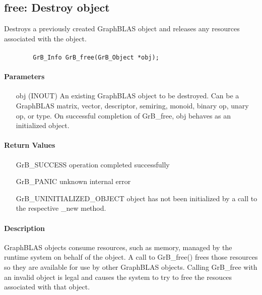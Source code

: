 \subsection{{\sf free}: Destroy object}

Destroys a previously created GraphBLAS object and releases any resources associated with the object.

\paragraph{\syntax}

\begin{verbatim}
        GrB_Info GrB_free(GrB_Object *obj);
\end{verbatim}


\paragraph{Parameters}

\begin{itemize}[leftmargin=1.1in]
	\item[{\sf obj}] ({\sf INOUT}) An existing GraphBLAS object to be destroyed. 
    Can be a GraphBLAS matrix, vector, descriptor, semiring, monoid, binary op, 
		unary op, or type. On successful completion of {\sf GrB\_free}, {\sf obj} behaves as an initialized object.
\end{itemize}

\paragraph{Return Values}

\begin{itemize}[leftmargin=2.1in]
\item[{\sf GrB\_SUCCESS}]        operation completed successfully
\item[{\sf GrB\_PANIC}]          unknown internal error
\item[{\sf GrB\_UNINITIALIZED\_OBJECT}]       object has not been initialized by a call 
                                 to the respective {\sf *\_new} method.
\end{itemize}

\paragraph{Description}

GraphBLAS objects consume resources, such as memory,  
managed by the runtime system on behalf of the object.  A call to {\sf GrB\_free()}
frees those resources so they are available for use by other GraphBLAS objects.
Calling {\sf GrB\_free} with an invalid object is legal and causes the system
to try to free the resouces associated with that object.
